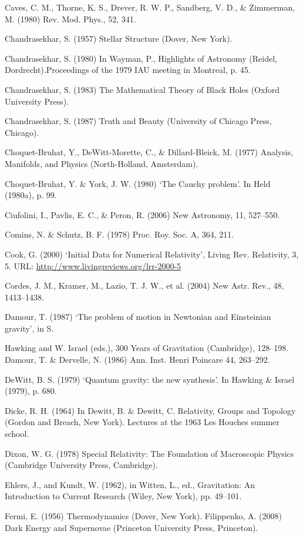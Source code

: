 {Caves, C. M., Thorne, K. S., Drever, R. W. P., Sandberg, V. D., \& Zimmerman, M. (1980) Rev. Mod. Phys., 52, 341.


Chandrasekhar, S. (1957) Stellar Structure (Dover, New York).


Chandrasekhar, S. (1980) In Wayman, P., Highlights of Astronomy (Reidel, Dordrecht).Proceedings of the 1979 IAU meeting in Montreal, p. 45.


Chandrasekhar, S. (1983) The Mathematical Theory of Black Holes (Oxford University Press).


Chandrasekhar, S. (1987) Truth and Beauty (University of Chicago Press, Chicago).


Choquet-Bruhat, Y., DeWitt-Morette, C., \& Dillard-Bleick, M. (1977) Analysis, Manifolds, and Physics (North-Holland, Amsterdam).


Choquet-Bruhat, Y. \& York, J. W. (1980) ‘The Cauchy problem’. In Held (1980a), p. 99.


Ciufolini, I., Pavlis, E. C., \& Peron, R. (2006) New Astronomy, 11, 527–550.


Comins, N. \& Schutz, B. F. (1978) Proc. Roy. Soc. A, 364, 211.


Cook, G. (2000) ‘Initial Data for Numerical Relativity’, Living Rev. Relativity, 3, 5. URL:
\url{http://www.livingreviews.org/lrr-2000-5}



Cordes, J. M., Kramer, M., Lazio, T. J. W., et al. (2004) New Astr. Rev., 48, 1413–1438.


Damour, T. (1987) ‘The problem of motion in Newtonian and Einsteinian gravity’, in S.


Hawking and W. Israel (eds.), 300 Years of Gravitation (Cambridge), 128–198.
Damour, T. \& Dervelle, N. (1986) Ann. Inst. Henri Poincare 44, 263–292.


DeWitt, B. S. (1979) ‘Quantum gravity: the new synthesis’. In Hawking \& Israel (1979), p. 680.


Dicke, R. H. (1964) In Dewitt, B. \& Dewitt, C. Relativity, Groups and Topology (Gordon and Breach, New York). Lectures at the 1963 Les Houches summer school.


Dixon, W. G. (1978) Special Relativity: The Foundation of Macroscopic Physics (Cambridge University Press, Cambridge).


Ehlers, J., and Kundt, W. (1962), in Witten, L., ed., Gravitation: An Introduction to Current Research (Wiley, New York), pp. 49–101.


Fermi, E. (1956) Thermodynamics (Dover, New York).
Filippenko, A. (2008) Dark Energy and Supernovae (Princeton University Press, Princeton).


}
